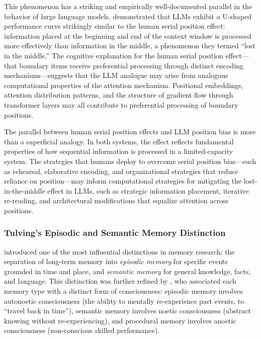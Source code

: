 This phenomenon has a striking and empirically well-documented parallel in the behavior of large language models. \citet{liu2024lost} demonstrated that LLMs exhibit a U-shaped performance curve strikingly similar to the human serial position effect: information placed at the beginning and end of the context window is processed more effectively than information in the middle, a phenomenon they termed ``lost in the middle.'' The cognitive explanation for the human serial position effect---that boundary items receive preferential processing through distinct encoding mechanisms---suggests that the LLM analogue may arise from analogous computational properties of the attention mechanism. Positional embeddings, attention distribution patterns, and the structure of gradient flow through transformer layers may all contribute to preferential processing of boundary positions.

The parallel between human serial position effects and LLM position bias is more than a superficial analogy. In both systems, the effect reflects fundamental properties of how sequential information is processed in a limited-capacity system. The strategies that humans deploy to overcome serial position bias---such as rehearsal, elaborative encoding, and organizational strategies that reduce reliance on position---may inform computational strategies for mitigating the lost-in-the-middle effect in LLMs, such as strategic information placement, iterative re-reading, and architectural modifications that equalize attention across positions.

\subsubsection{Tulving's Episodic and Semantic Memory Distinction}

\citet{tulving1972episodic} introduced one of the most influential distinctions in memory research: the separation of long-term memory into \emph{episodic memory} for specific events grounded in time and place, and \emph{semantic memory} for general knowledge, facts, and language. This distinction was further refined by \citet{tulving1985memory}, who associated each memory type with a distinct form of consciousness: episodic memory involves autonoetic consciousness (the ability to mentally re-experience past events, to ``travel back in time''), semantic memory involves noetic consciousness (abstract knowing without re-experiencing), and procedural memory involves anoetic consciousness (non-conscious skilled performance).


